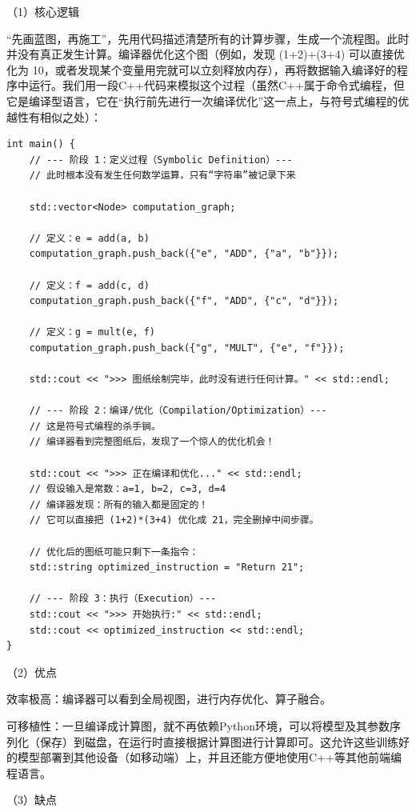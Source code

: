 （1）核心逻辑

``先画蓝图，再施工''，先用代码描述清楚所有的计算步骤，生成一个流程图。此时并没有真正发生计算。编译器优化这个图（例如，发现 (1+2)+(3+4) 可以直接优化为 10，或者发现某个变量用完就可以立刻释放内存），再将数据输入编译好的程序中运行。我们用一段C++代码来模拟这个过程（虽然C++属于命令式编程，但它是编译型语言，它在``执行前先进行一次编译优化''这一点上，与符号式编程的优越性有相似之处）：

\begin{verbatim}
int main() {
    // --- 阶段 1：定义过程（Symbolic Definition）---
    // 此时根本没有发生任何数学运算，只有“字符串”被记录下来

    std::vector<Node> computation_graph;

    // 定义：e = add(a, b)
    computation_graph.push_back({"e", "ADD", {"a", "b"}});

    // 定义：f = add(c, d)
    computation_graph.push_back({"f", "ADD", {"c", "d"}});

    // 定义：g = mult(e, f)
    computation_graph.push_back({"g", "MULT", {"e", "f"}});

    std::cout << ">>> 图纸绘制完毕，此时没有进行任何计算。" << std::endl;

    // --- 阶段 2：编译/优化（Compilation/Optimization）---
    // 这是符号式编程的杀手锏。
    // 编译器看到完整图纸后，发现了一个惊人的优化机会！

    std::cout << ">>> 正在编译和优化..." << std::endl;
    // 假设输入是常数：a=1, b=2, c=3, d=4
    // 编译器发现：所有的输入都是固定的！
    // 它可以直接把 (1+2)*(3+4) 优化成 21，完全删掉中间步骤。

    // 优化后的图纸可能只剩下一条指令：
    std::string optimized_instruction = "Return 21";

    // --- 阶段 3：执行（Execution）---
    std::cout << ">>> 开始执行:" << std::endl;
    std::cout << optimized_instruction << std::endl;
}
\end{verbatim}

（2）优点

效率极高：编译器可以看到全局视图，进行内存优化、算子融合。

可移植性：一旦编译成计算图，就不再依赖Python环境，可以将模型及其参数序列化（保存）到磁盘，在运行时直接根据计算图进行计算即可。这允许这些训练好的模型部署到其他设备（如移动端）上，并且还能方便地使用C++等其他前端编程语言。

（3）缺点

